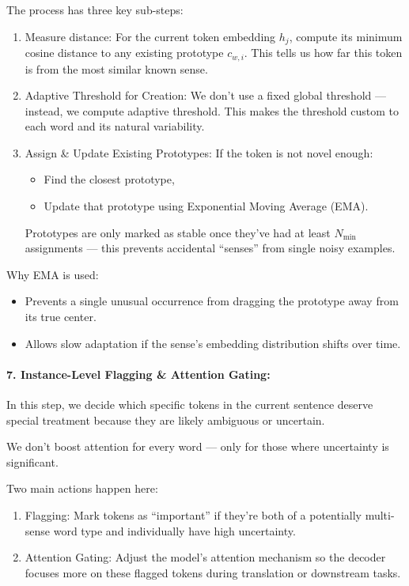 \documentclass[a4paper,12pt]{article}
\begin{document}
The process has three key sub-steps:
\begin{enumerate}
    \item Measure distance: For the current token embedding $h_j$, compute its minimum cosine distance to any existing prototype $c_{w,i}$. This tells us how far this token is from the most similar known sense.
    \item Adaptive Threshold for Creation: We don’t use a fixed global threshold --- instead, we compute adaptive threshold. This makes the threshold custom to each word and its natural variability.
    \item Assign \& Update Existing Prototypes: If the token is not novel enough:
    \begin{itemize}
        \item Find the closest prototype,
        \item Update that prototype using Exponential Moving Average (EMA).
    \end{itemize}
    
    Prototypes are only marked as stable once they’ve had at least $N_{\min}$ assignments --- this prevents accidental ``senses'' from single noisy examples.
\end{enumerate}

Why EMA is used:
\begin{itemize}
    \item Prevents a single unusual occurrence from dragging the prototype away from its true center.
    \item Allows slow adaptation if the sense’s embedding distribution shifts over time.
\end{itemize}

\paragraph{7. Instance-Level Flagging \& Attention Gating:}
In this step, we decide which specific tokens in the current sentence deserve special treatment because they are likely ambiguous or uncertain.

We don’t boost attention for every word --- only for those where uncertainty is significant.

Two main actions happen here:
\begin{enumerate}
    \item Flagging: Mark tokens as ``important'' if they’re both of a potentially multi-sense word type and individually have high uncertainty.
    \item Attention Gating: Adjust the model’s attention mechanism so the decoder focuses more on these flagged tokens during translation or downstream tasks.
\end{enumerate}
\end{document}
